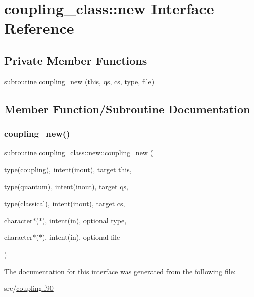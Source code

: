 \hypertarget{interfacecoupling__class_1_1new}{}\section{coupling\+\_\+class\+:\+:new Interface Reference}
\label{interfacecoupling__class_1_1new}
\subsection*{Private Member Functions}
\begin{DoxyCompactItemize}
\item 
subroutine \hyperlink{interfacecoupling__class_1_1new_a38d820435f29e699f3dccfec75c65857}{coupling\+\_\+new} (this, qs, cs, type, file)
\end{DoxyCompactItemize}


\subsection{Member Function/\+Subroutine Documentation}
\mbox{\label{interfacecoupling__class_1_1new_a38d820435f29e699f3dccfec75c65857}} 
\subsubsection{\texorpdfstring{coupling\+\_\+new()}{coupling\_new()}}
{\footnotesize\ttfamily subroutine coupling\+\_\+class\+::new\+::coupling\+\_\+new (\begin{DoxyParamCaption}\item[{type(\hyperlink{structcoupling__class_1_1coupling}{coupling}), intent(inout), target}]{this,  }\item[{type(\hyperlink{structquantum__class_1_1quantum}{quantum}), intent(inout), target}]{qs,  }\item[{type(\hyperlink{structclassical__class_1_1classical}{classical}), intent(inout), target}]{cs,  }\item[{character$\ast$($\ast$), intent(in), optional}]{type,  }\item[{character$\ast$($\ast$), intent(in), optional}]{file }\end{DoxyParamCaption})\hspace{0.3cm}{\ttfamily [private]}}



The documentation for this interface was generated from the following file\+:\begin{DoxyCompactItemize}
\item 
src/\hyperlink{coupling_8f90}{coupling.\+f90}\end{DoxyCompactItemize}
